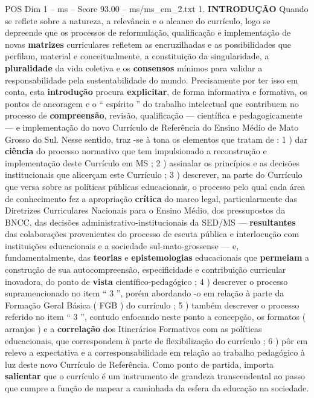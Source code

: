 \begin{textsample}{POS Dim 1 – ms – Score 93.00 – ms/ms\_em\_2.txt}  \label{ex:f1_pos_181}
1. \textbf{INTRODUÇÃO} Quando se reflete sobre a natureza, a relevância e o alcance do currículo, logo se depreende que os processos de reformulação, qualificação e implementação de novas \textbf{matrizes} curriculares refletem as encruzilhadas e as possibilidades que perfilam, material e conceitualmente, a constituição da singularidade, a \textbf{pluralidade} da vida coletiva e os \textbf{consensos} mínimos para validar a responsabilidade pela sustentabilidade do mundo.
Precisamente por ter isso em conta, esta \textbf{introdução} procura \textbf{explicitar}, de forma informativa e formativa, os pontos de ancoragem e o “ espírito ” do trabalho intelectual que contribuem no processo de \textbf{compreensão}, revisão, qualificação — científica e pedagogicamente — e implementação do novo Currículo de Referência do Ensino Médio de Mato Grosso do Sul.
Nesse sentido, traz -se à tona os elementos que tratam de : 1 ) dar \textbf{ciência} do processo normativo que tem impulsionado a reconstrução e implementação deste Currículo em MS ; 2 ) assinalar os princípios e as decisões institucionais que alicerçam este Currículo ; 3 ) descrever, na parte do Currículo que versa sobre as políticas públicas educacionais, o processo pelo qual cada área de conhecimento fez a apropriação \textbf{crítica} do marco legal, particularmente das Diretrizes Curriculares Nacionais para o Ensino Médio, dos pressupostos da BNCC, das decisões administrativo-institucionais da SED/MS — \textbf{resultantes} das colaborações provenientes do processo de escuta pública e interlocução com instituições educacionais e a sociedade sul-mato-grossense — e, fundamentalmente, das \textbf{teorias} e \textbf{epistemologias} educacionais que \textbf{permeiam} a construção de sua autocompreensão, especificidade e contribuição curricular inovadora, do ponto de \textbf{vista} científico-pedagógico ; 4 ) descrever o processo supramencionado no item “ 3 ”, porém abordando -o em relação à parte da Formação Geral Básica ( FGB ) do currículo ; 5 ) também descrever o processo referido no item “ 3 ”, contudo enfocando neste ponto a concepção, os formatos ( arranjos ) e a \textbf{correlação} dos Itinerários Formativos com as políticas educacionais, que correspondem à parte de flexibilização do currículo ; 6 ) pôr em relevo a expectativa e a corresponsabilidade em relação ao trabalho pedagógico à luz deste novo Currículo de Referência.
Como ponto de partida, importa \textbf{salientar} que o currículo é um instrumento de grandeza transcendental ao passo que cumpre a função de mapear a caminhada da esfera da educação na sociedade.

\end{textsample}
